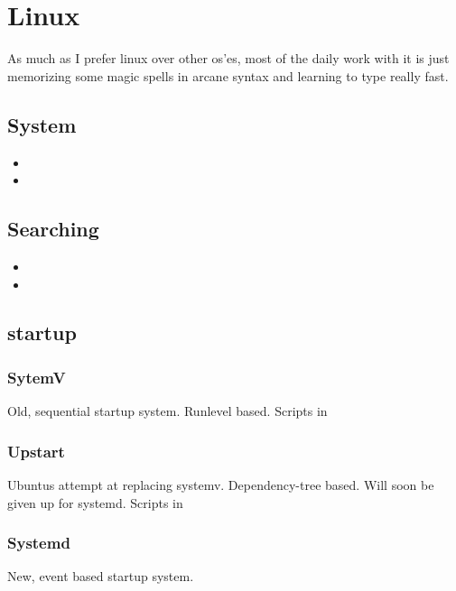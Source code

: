 \section{Linux}

As much as I prefer linux over other os'es, most of the daily work with it is just memorizing some magic spells in arcane syntax and learning to type really fast. 

\subsection{System}

\begin{itemize}
    \item {}
    \item {}
\end{itemize}

\subsection{Searching}

\begin{itemize}
    \item {}
    \item {}
\end{itemize}


\subsection{startup}

\subsubsection{SytemV}
Old, sequential startup system. Runlevel based. 
Scripts in 

\subsubsection{Upstart}
Ubuntus attempt at replacing systemv. Dependency-tree based.  Will soon be given up for systemd. 
Scripts in 

\subsubsection{Systemd}
New, event based startup system. 
